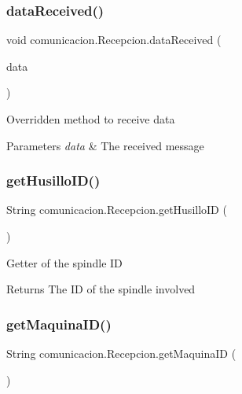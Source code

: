\subsubsection{\texorpdfstring{data\+Received()}{dataReceived()}}
{\footnotesize\ttfamily void comunicacion.\+Recepcion.\+data\+Received (\begin{DoxyParamCaption}\item[{X\+Bee\+Message}]{data }\end{DoxyParamCaption})\hspace{0.3cm}{\ttfamily [inline]}}

Overridden method to receive data 
\begin{DoxyParams}{Parameters}
{\em data} & The received message \\
\hline
\end{DoxyParams}
\mbox{\label{classcomunicacion_1_1_recepcion_a28eb0ee1c4a921ad9df8f893ba6809ed}} 
\subsubsection{\texorpdfstring{get\+Husillo\+I\+D()}{getHusilloID()}}
{\footnotesize\ttfamily String comunicacion.\+Recepcion.\+get\+Husillo\+ID (\begin{DoxyParamCaption}{ }\end{DoxyParamCaption})\hspace{0.3cm}{\ttfamily [inline]}}

Getter of the spindle ID \begin{DoxyReturn}{Returns}
The ID of the spindle involved 
\end{DoxyReturn}
\mbox{\label{classcomunicacion_1_1_recepcion_ab22533d01a1695958053c9898318f993}} 
\subsubsection{\texorpdfstring{get\+Maquina\+I\+D()}{getMaquinaID()}}
{\footnotesize\ttfamily String comunicacion.\+Recepcion.\+get\+Maquina\+ID (\begin{DoxyParamCaption}{ }\end{DoxyParamCaption})\hspace{0.3cm}{\ttfamily [inline]}}

